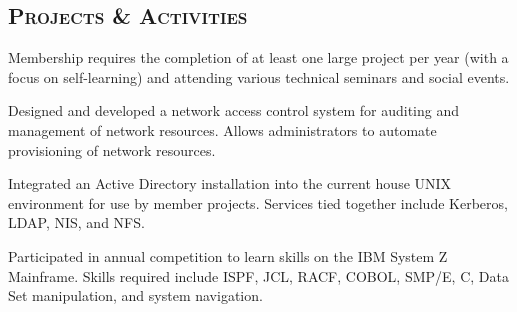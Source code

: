 \begin{resume}
\section{\textsc{Projects \& Activities}}

\begin{position}
Membership requires the completion of at least one large project per year (with a focus on self-learning) and attending various technical seminars and social events.
\end{position}

\begin{position}
Designed and developed a network access control system for auditing and management of network resources. Allows administrators to automate provisioning of network resources.
\end{position}

\begin{position}
Integrated an Active Directory installation into the current house UNIX environment for use by member projects. Services tied together include Kerberos, LDAP, NIS, and NFS. 
\end{position}


\begin{position}
Participated in annual competition to learn skills on the IBM System Z Mainframe. Skills required include ISPF, JCL, RACF, COBOL, SMP/E, C, Data Set manipulation, and system navigation.
\end{position}



\end{resume}
